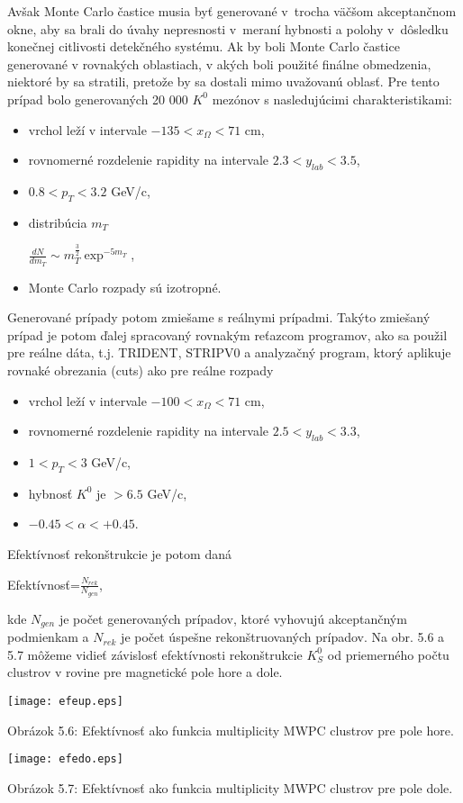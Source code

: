 Avšak Monte Carlo častice musia byť generované v~trocha väčšom
akceptančnom okne, aby sa brali do úvahy nepresnosti v~meraní hybnosti a
polohy v~dôsledku konečnej citlivosti detekčného systému. Ak by boli Monte
Carlo častice generované v rovnakých oblastiach, v akých boli použité
finálne obmedzenia, niektoré by sa stratili, pretože by sa dostali mimo
uvažovanú oblasť. Pre tento prípad bolo generovaných 20 000 $K^{0}$  mezónov
s nasledujúcimi charakteristikami:
\begin{itemize}
\item vrchol leží v intervale $-135<x_{\Omega}<71$ cm,
\item rovnomerné rozdelenie rapidity na intervale $2.3<y_{lab}<3.5$,
\item $0.8<p_{T}<3.2$ GeV/c,
\item distribúcia $m_{T}$
  \begin{center}
    $\frac{dN}{dm_{T}} \sim m_{T}^{\frac{3}{2}}\exp^{-5 m_{T}}$,
  \end{center}
\item Monte Carlo rozpady sú izotropné.

\end{itemize}
Generované prípady potom zmiešame s reálnymi prípadmi. Takýto zmiešaný
prípad je potom ďalej spracovaný rovnakým reťazcom programov, ako sa
použil pre reálne dáta, t.j. TRIDENT, STRIPV0 a analyzačný program, ktorý
aplikuje rovnaké obrezania (cuts) ako pre reálne rozpady
\begin{itemize}
\item vrchol leží v intervale $-100<x_{\Omega}<71$ cm,
\item rovnomerné rozdelenie rapidity na intervale $2.5<y_{lab}<3.3$,
\item $1<p_{T}<3$ GeV/c,
\item hybnosť $K^{0}$ je $>6.5$ GeV/c,
\item $-0.45<\alpha<+0.45$.
\end{itemize}
Efektívnosť rekonštrukcie je potom daná
\begin{center}
  Efektívnosť=$\frac{N_{rek}}{N_{gen}}$,
\end{center}
kde $N_{gen}$ je počet generovaných prípadov, ktoré vyhovujú akceptančným
podmienkam a $N_{rek}$ je počet úspešne rekonštruovaných prípadov.
Na obr. 5.6 a 5.7 môžeme vidieť závislosť efektívnosti rekonštrukcie
$K^{0}_{S}$ od priemerného počtu clustrov v rovine pre magnetické pole hore a
dole.

\newpage
\begin{center}
  \texttt{[image: efeup.eps]}
\end{center}
\begin{center}
  Obrázok 5.6: Efektívnosť ako funkcia multiplicity MWPC
  clustrov pre pole hore.
\end{center}

\begin{center}
  \texttt{[image: efedo.eps]}
\end{center}
\begin{center}
  Obrázok 5.7: Efektívnosť ako funkcia multiplicity MWPC
  clustrov pre pole dole.
\end{center}




%
